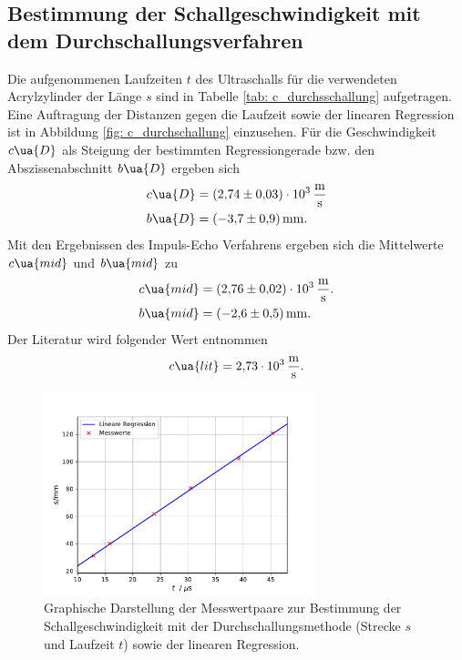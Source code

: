 \subsection{Bestimmung der Schallgeschwindigkeit mit dem Durchschallungsverfahren}
Die aufgenommenen Laufzeiten $t$ des Ultraschalls für die verwendeten Acrylzylinder der Länge $s$ sind
in Tabelle \ref{tab: c_durchsschallung} aufgetragen. Eine Auftragung der Distanzen gegen die Laufzeit sowie
der linearen Regression ist in Abbildung \ref{fig: c_durchschallung} einzusehen. Für die Geschwindigkeit $c\ua{D}$
als Steigung der bestimmten Regressiongerade bzw. den Abszissenabschnitt $b\ua{D}$ ergeben sich
\begin{align}
  \begin{aligned}
    c\ua{D} &= \SI{+2.74(3)e+03}{\meter\per\second}\\
    b\ua{D} &= \SI{-3.7(9)}{\milli\meter}.
  \end{aligned}
\end{align}
Mit den Ergebnissen des Impuls-Echo Verfahrens ergeben sich die Mittelwerte $c\ua{mid}$ und $b\ua{mid}$ zu
\begin{align}
  \begin{aligned}
  c\ua{mid} &= \SI{+2.76(2)e+03}{\meter\per\second}. \\
  b\ua{mid} &= \SI{-2.6(5)}{\milli\meter}.
\end{aligned}
\end{align}
Der Literatur \cite{olympus} wird folgender Wert entnommen
\begin{equation}
  c\ua{lit} = \SI{2.73e3}{\meter\per\second}.
  \label{eq: c_lit}
\end{equation}


\begin{figure}[H]
  \centering
  \includegraphics[width = 0.7\textwidth]{../Messdaten/plots/schallgeschwindigkeit_durchschallung.pdf}
  \caption{Graphische Darstellung der Messwertpaare zur Bestimmung der Schallgeschwindigkeit
  mit der Durchschallungsmethode (Strecke $s$ und Laufzeit $t$) sowie der linearen Regression.}
  \label{fig: c_durchsschallung}
\end{figure}

